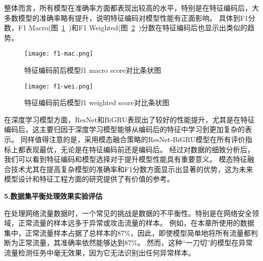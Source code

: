 整体而言，所有模型在准确率方面都表现出较高的水平，特别是在特征编码后，大多数模型的准确率略有提升，说明特征编码对模型性能有正面影响。
具体到F1分数，F1 Macro(图~\ref{fig:f1_macro_score}~)和F1 Weighted(图~\ref{fig:f1_weighted_score}~)分数在特征编码后也显示出类似的趋势。
\begin{figure}[htbp]
	\centering
	\texttt{[image: f1-mac.png]}
	\caption{特征编码前后模型f1 macro score对比条状图}
	\label{fig:f1_macro_score}
\end{figure}
\begin{figure}[htbp]
	\centering
	\texttt{[image: f1-wei.png]}
	\caption{特征编码前后模型f1 weighted score对比条状图}
	\label{fig:f1_weighted_score}
\end{figure}
在深度学习模型方面，ResNet和BiGRU表现出了较好的性能提升，尤其是在特征编码后，这主要归因于深度学习模型能够从编码后的特征中学习到更加复杂的表示。
同样值得注意的是，采用模态融合策略的ResNet-BiGRU模型在所有评价指标上都表现最优，无论是在特征编码前还是编码后。
经过对数据的细致分析后，我们可以看到特征编码和模型选择对于提升模型性能具有重要意义。
模态特征融合技术尤其在提高复杂模型的准确率和F1分数方面显示出显著的优势，这为未来模型设计和特征工程方面的研究提供了有价值的参考。\par

\textbf{5.数据集平衡处理效果实验评估}\par
在处理网络流量数据时，一个常见的挑战是数据的不平衡性。特别是在网络安全领域，正常流量的样本远多于异常或攻击流量的样本。
例如，在本章所使用的数据集中，正常流量样本占据了总样本的87\%，因此，即使模型简单地将所有流量都判断为正常流量，其准确率依然能够达到87\%。
然而，这种“一刀切”的模型在异常流量检测任务中毫无效果，因为它无法识别出任何异常样本。\par

